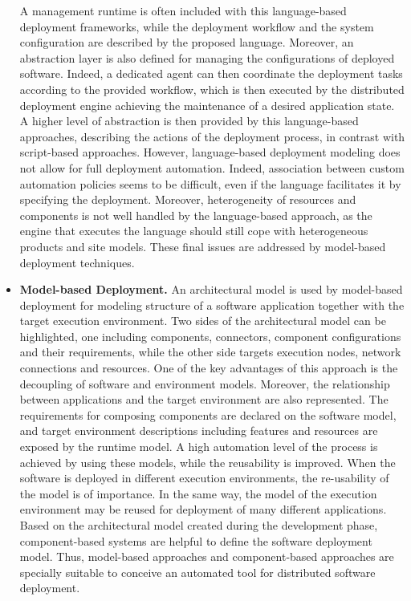 \begin{itemize}
	A management runtime is often included with this language-based deployment frameworks, while the deployment workflow and the system configuration are described by the proposed language.
	Moreover, an abstraction layer is also defined for managing the configurations of deployed software. 
	Indeed, a dedicated agent can then coordinate the deployment tasks according to the provided workflow, which is then executed by the distributed deployment engine achieving the maintenance of a desired application state.
	A higher level of abstraction is then provided by this language-based approaches, describing the actions of the deployment process, in contrast with script-based approaches.
	However, language-based deployment modeling does not allow for full deployment automation.
	Indeed, association between custom automation policies seems to be difficult, even if the language facilitates it by specifying the deployment.
	Moreover, heterogeneity of resources and components is not well handled by the language-based approach, as the engine that executes the language should still cope with heterogeneous products and site models.
	These final issues are addressed by model-based deployment techniques.
	
	\item \textbf{Model-based Deployment.} An architectural model is used by model-based deployment for modeling structure of a software application together with the target execution environment.
	Two sides of the architectural model can be highlighted, one including components, connectors, component configurations and their requirements, while the other side targets execution nodes, network connections and resources.
	One of the key advantages of this approach is the decoupling of software and environment models.
	Moreover, the relationship between applications and the target environment are also represented.
	The requirements for composing components are declared on the software model, and target environment descriptions including features and resources are exposed by the runtime model.
	A high automation level of the process is achieved by using these models, while the reusability is improved.
	When the software is deployed in different execution environments, the re-usability of the model is of importance.
	In the same way, the model of the execution environment may be reused for deployment of many different applications. 
	Based on the architectural model created during the development phase, component-based systems are helpful to define the software deployment model.
	Thus, model-based approaches and component-based approaches are specially suitable to conceive an automated tool for distributed software deployment.
\end{itemize}


